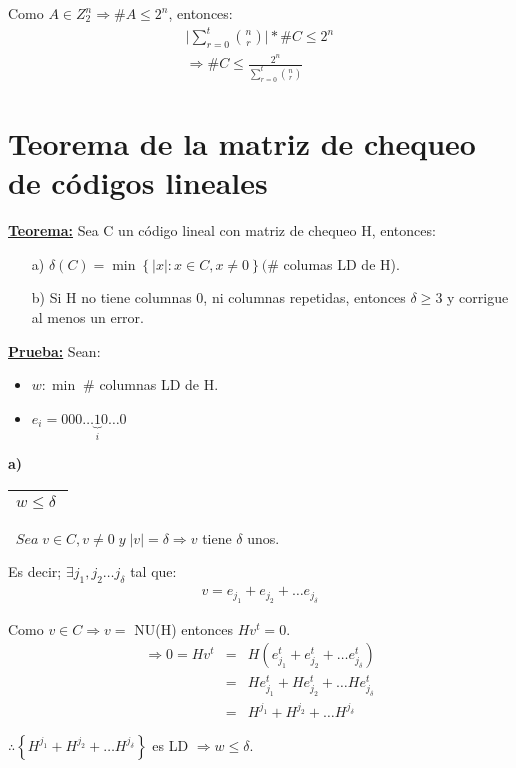 \documentclass[12pt,a4paper]{report}
\newcounter{neq}
\begin{document}
			\par Como $A \in Z_{2}^{n} \Rightarrow \# A \leq 2^{n}$, entonces:
			\begin{eqnarray}
				\nonumber \lvert \sum_{r = 0}^{t} {n \choose r} \rvert * \# C \leq 2^{n} \\
				\nonumber \Rightarrow \# C \leq \frac{2^{n}}{\sum_{r = 0}^{t} {n \choose r}}
			\end{eqnarray}


	\section{Teorema de la matriz de chequeo de códigos lineales}
		\textbf{\underline{Teorema:}} Sea C un código lineal con matriz de chequeo H, entonces:
			\begin{itemize}
				\item[a)] $\delta(C) = \min \left\lbrace \lvert x \rvert : x \in C , x \neq 0 \right\rbrace (\#$ columas LD de H).
				\item[b)] Si H no tiene columnas 0, ni columnas repetidas, entonces $\delta \geq 3$ y corrigue al menos un error.
			\end{itemize}

		\textbf{\underline{Prueba:}} Sean:
			\begin{itemize}
				\item $w : \min \; \#$ columnas LD de H.
				\item $e_{i} = 000 \dotsc \underbrace{1}_{i} 0 \dotsc 0$
			\end{itemize}

			\textbf{a)} \begin{tabular}{|c|} \hline $w \leq \delta \; $ \\\hline \end{tabular} $ \; \; Sea \; v \in C , v \neq 0 \; y \; \lvert v \rvert = \delta \Rightarrow v$ tiene $\delta$ unos.

			\vspace{3mm}
			\par Es decir; $\exists j_{1}, j_{2} \dotsc j_{\delta}$ tal que:
			\begin{eqnarray}
				\nonumber v = e_{j_{1}} + e_{j_{2}} + \dotsc e_{j_{\delta}}
			\end{eqnarray}

			\par Como $ v \in C \Rightarrow v =$ NU(H) entonces $Hv^{t} = 0$.
			\begin{eqnarray}
				\nonumber \Rightarrow 0 = Hv^{t} &=& H(e_{j_{1}}^{t} + e_{j_{2}}^{t} + \dotsc e_{j_{\delta}}^{t}) \\
				\nonumber &=& H e_{j_{1}}^{t} + H e_{j_{2}}^{t} + \dotsc H e_{j_{\delta}}^{t} \\
				\nonumber &=& H^{j_{1}} + H^{j_{2}} + \dotsc H^{j_{\delta}}
			\end{eqnarray}
			\par $\therefore \left\lbrace H^{j_{1}} + H^{j_{2}} + \dotsc H^{j_{\delta}} \right\rbrace$ es LD $\Rightarrow w \leq \delta$.
\end{document}
